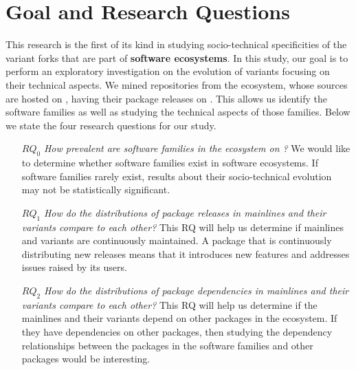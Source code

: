 \section{Goal and Research Questions}
This research is the first of its kind in studying socio-technical specificities of the variant forks that are part of \textbf{software ecosystems}. In this study, our goal is to perform an exploratory investigation on the evolution of variants focusing on their technical aspects. We mined repositories from the \js ecosystem, whose sources are hosted on \gh, having their package releases on \np. This allows us identify the software families as well as studying the technical aspects of those families.
Below we state the four research questions for our study.
\begin{itemize}
\item[\textbf{$RQ_0$}] \textit{How prevalent are software families in the \js ecosystem on \gh?}
We would like to determine whether software families exist in software ecosystems. If software families rarely exist, results about their socio-technical evolution may not be statistically significant.
\item[\textbf{$RQ_1$}] \textit{How do the distributions of package releases in mainlines and their variants compare to each other?}
This RQ will help us determine if mainlines and variants are continuously maintained. A package that is continuously distributing new releases means that it introduces new features and addresses issues raised by its users.


\item[\textbf{$RQ_2$}] \textit{How do the distributions of package dependencies in mainlines and their variants compare to each other?}
This RQ will help us determine if the mainlines and their variants depend on other packages in the \np ecosystem. If they have dependencies on other packages, then studying the dependency relationships between the packages in the software families and other packages would be interesting.


\end{itemize}

